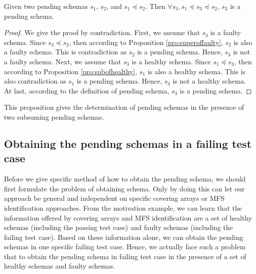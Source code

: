 %
\begin{proposition}\label{pro:pending}
Given two pending schemas $s_{1}$, $s_{2}$, and $s_{1} \preceq s_{2}$. Then $\forall s_{3}, s_{1} \preceq s_{3} \preceq s_{2}$, $s_{3}$ is a pending schema.
\end{proposition}

\begin{proof}
We give the proof by contradiction. First, we assume that $s_{3}$ is a faulty schema. Since $s_{3} \preceq s_{2}$, then according to Proposition \ref{pro:superoffaulty}, $s_{2}$ is also a faulty schema. This is contradiction as $s_{2}$ is a pending schema. Hence, $s_{3}$ is not a faulty schema. Next, we assume that $s_{3}$ is a healthy schema.  Since $s_{1} \preceq s_{3}$, then according to Proposition \ref{pro:subofhealthy}, $s_{1}$ is also a healthy schema. This is also contradiction as $s_{1}$ is a pending schema.  Hence, $s_{3}$ is not a healthy schema. At last, according to the definition of pending schema, $s_{3}$ is a pending schema.
\end{proof}

This proposition gives the determination of pending schemas in the presence of two subsuming pending schemas.


%

\subsection{Obtaining the pending schemas in a failing test case}
Before we give specific method of how to obtain the pending schema, we should first formulate the problem of obtaining schema. Only by doing this can let our approach be general and independent on specific covering arrays or MFS identification approaches. From the motivation example, we can learn that the information offered by covering arrays and MFS identification are a set of healthy schemas (including the passing test case) and faulty schemas (including the failing test case). Based on these information alone, we can obtain the pending schemas in one specific failing test case. Hence, we actually face such a problem that to obtain the pending schema in failing test case in the presence of a set of healthy schemas and faulty schemas.

